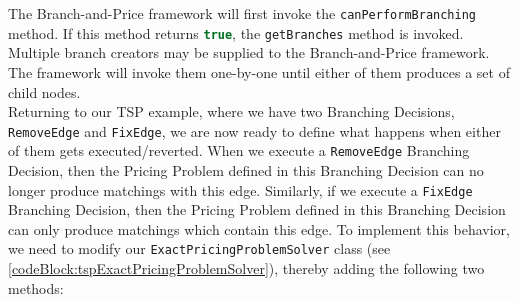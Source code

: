 \documentclass[a4paper]{article}
\newcommand{\code}[1]{\lstinline[language=java, style=seminar]!#1!}
\begin{document}
The Branch-and-Price framework will first invoke the \code{canPerformBranching} method. If this method returns \code{true}, the \code{getBranches} method is invoked. Multiple branch creators may be supplied to the Branch-and-Price framework. The framework will invoke them one-by-one until either of them produces a set of child nodes.\\
Returning to our TSP example, where we have two Branching Decisions, \code{RemoveEdge} and \code{FixEdge}, we are now ready to define what happens when either of them gets executed/reverted. When we execute a \code{RemoveEdge} Branching Decision, then the Pricing Problem defined in this Branching Decision can no longer produce matchings with this edge. Similarly, if we execute a \code{FixEdge} Branching Decision, then the Pricing Problem defined in this Branching Decision can only produce matchings which contain this edge. To implement this behavior, we need to modify our \code{ExactPricingProblemSolver} class (see \ref{codeBlock:tspExactPricingProblemSolver}), thereby adding the following two methods:
\end{document}
